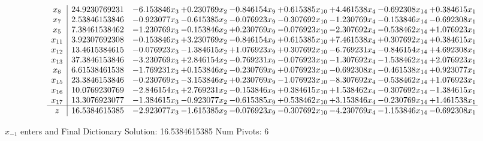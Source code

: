 \documentclass[10pt]{article}
\begin{document}
 \[\begin{array}{c| c c@{\hskip 2pt} c@{\hskip 2pt} c@{\hskip 2pt} c@{\hskip 2pt} c@{\hskip 2pt} c@{\hskip 2pt} c@{\hskip 2pt} }
 x_{8}   &  24.9230769231 & -6.153846 x_{3} & + 0.230769 x_{2} & -0.846154 x_{9} & + 0.615385 x_{10} & + 4.461538 x_{4} & -0.692308 x_{14} & + 0.384615 x_{1}\\
 x_{7}   &  2.53846153846 & -0.923077 x_{3} & -0.615385 x_{2} & -0.076923 x_{9} & -0.307692 x_{10} & -1.230769 x_{4} & -0.153846 x_{14} & -0.692308 x_{1}\\
 x_{5}   &  7.38461538462 & -1.230769 x_{3} & -0.153846 x_{2} & + 0.230769 x_{9} & -0.076923 x_{10} & -2.307692 x_{4} & -0.538462 x_{14} & + 1.076923 x_{1}\\
 x_{11}   &  3.92307692308 & -0.153846 x_{3} & + 3.230769 x_{2} & -0.846154 x_{9} & + 0.615385 x_{10} & + 7.461538 x_{4} & + 0.307692 x_{14} & + 0.384615 x_{1}\\
 x_{12}   &  13.4615384615 & -0.076923 x_{3} & -1.384615 x_{2} & + 1.076923 x_{9} & + 0.307692 x_{10} & -6.769231 x_{4} & -0.846154 x_{14} & + 4.692308 x_{1}\\
 x_{13}   &  37.3846153846 & -3.230769 x_{3} & + 2.846154 x_{2} & -0.769231 x_{9} & -0.076923 x_{10} & -1.307692 x_{4} & -1.538462 x_{14} & + 2.076923 x_{1}\\
 x_{6}   &  6.61538461538 & -1.769231 x_{3} & + 0.153846 x_{2} & -0.230769 x_{9} & + 0.076923 x_{10} & -0.692308 x_{4} & -0.461538 x_{14} & + 0.923077 x_{1}\\
 x_{15}   &  23.3846153846 & -0.230769 x_{3} & -3.153846 x_{2} & + 0.230769 x_{9} & -1.076923 x_{10} & -8.307692 x_{4} & -0.538462 x_{14} & + 1.076923 x_{1}\\
 x_{16}   &  10.0769230769 & -2.846154 x_{3} & + 2.769231 x_{2} & -0.153846 x_{9} & + 0.384615 x_{10} & + 1.538462 x_{4} & -0.307692 x_{14} & -1.384615 x_{1}\\
 x_{17}   &  13.3076923077 & -1.384615 x_{3} & -0.923077 x_{2} & -0.615385 x_{9} & + 0.538462 x_{10} & + 3.153846 x_{4} & -0.230769 x_{14} & + 1.461538 x_{1}\\
\hline
z    &  16.5384615385 & -2.923077 x_{3} & -1.615385 x_{2} & -0.076923 x_{9} & -0.307692 x_{10} & -4.230769 x_{4} & -1.153846 x_{14} & -0.692308 x_{1}\\
\end{array}\]


 $ x_{-1} $ enters and Final Dictionary
Solution:  16.5384615385
Num Pivots:  6
\end{document}
